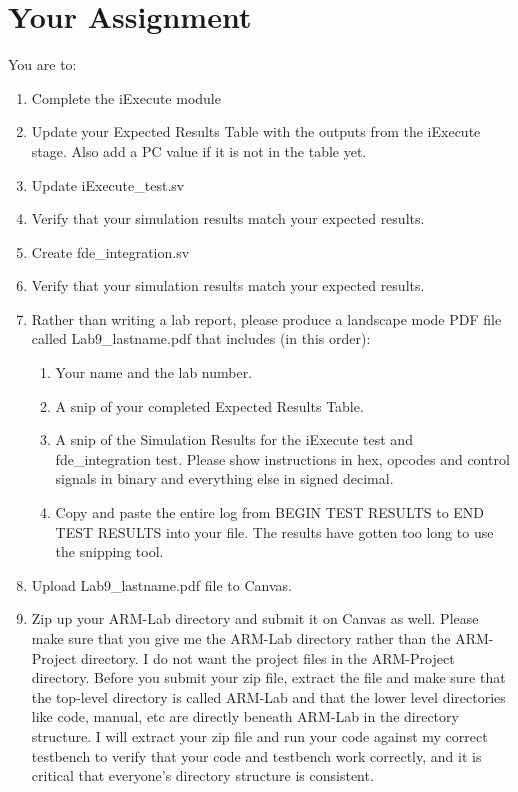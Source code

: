 \section{Your Assignment}
You are to:
\begin{enumerate}
\item Complete the iExecute module 
\item Update your Expected Results Table with the outputs from the iExecute stage.  Also add a PC value if it is not in the table yet. 
\item Update iExecute\_test.sv
\item Verify that your simulation results match your expected results.
\item Create fde\_integration.sv
\item Verify that your simulation results match your expected results.
\item Rather than writing a lab report, please produce a landscape mode PDF file called Lab9\_lastname.pdf that includes (in this order):
\begin{enumerate}
	\item Your name and the lab number.
	\item A snip of your completed Expected Results Table.
	\item A snip of the Simulation Results for the iExecute test and fde\_integration test.  Please show instructions in hex, opcodes and control signals in binary and everything else in signed decimal.  
	\item Copy and paste the entire log from BEGIN TEST RESULTS to END TEST RESULTS into your file.  The results have gotten too long to use the snipping tool.	
\end{enumerate}
\item Upload Lab9\_lastname.pdf file to Canvas.
\item Zip up your ARM-Lab directory and submit it on Canvas as well.  Please make sure that you give me the ARM-Lab directory rather than the ARM-Project directory.  I do not want the project files in the ARM-Project directory.  Before you submit your zip file, extract the file and make sure that the top-level directory is called ARM-Lab and that the lower level directories like code, manual, etc are directly beneath ARM-Lab in the directory structure.  I will extract your zip file and run your code against my correct testbench to verify that your code and testbench work correctly, and it is critical that everyone's directory structure is consistent.
\end{enumerate} 